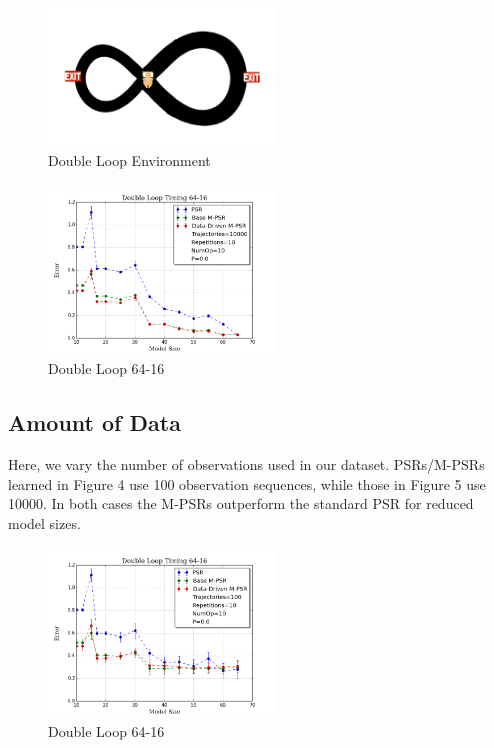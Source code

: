 \begin{figure}[ht!]
\centering
\includegraphics[width=60mm]{uCOREPICS/DL/doubleLoopImage.png}
\caption{Double Loop Environment\label{overflow}}
\end{figure}

\begin{figure}[ht!]
\centering
\includegraphics[width=60mm]{uCOREPICS/DL/64-16-10000.png}
\caption{Double Loop 64-16\label{overflow}}
\end{figure}

\subsection{Amount of Data}

Here, we vary the number of observations used in our dataset. PSRs/M-PSRs learned in Figure 4 use 100 observation sequences, while those in Figure 5 use 10000. In both cases the M-PSRs outperform the standard PSR for reduced model sizes.

\begin{figure}[ht!]
\centering
\includegraphics[width=60mm]{uCOREPICS/DL/64-16-100.png}
\caption{Double Loop 64-16\label{overflow}}
\end{figure}

